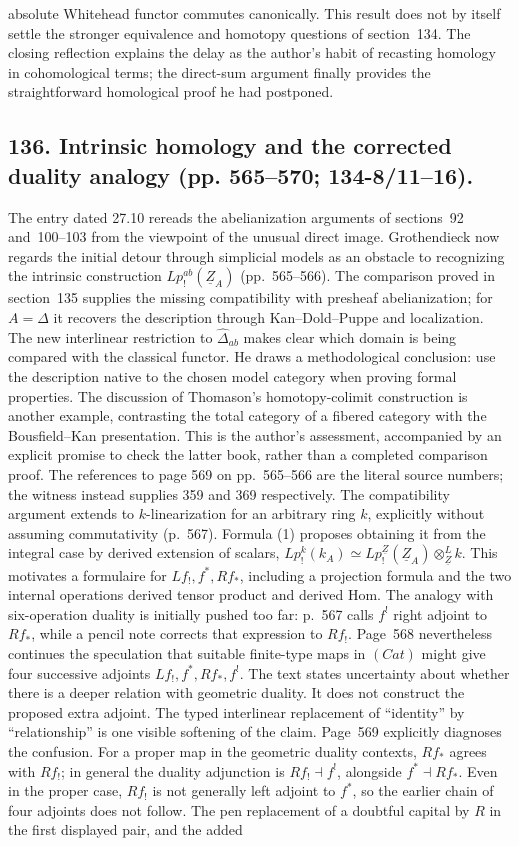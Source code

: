 \documentclass[10pt,oneside]{book}
\begin{document}
absolute Whitehead functor commutes canonically. This result does not by itself settle the stronger equivalence and homotopy questions of section~134. The closing reflection explains the delay as the author's habit of recasting homology in cohomological terms; the direct-sum argument finally provides the straightforward homological proof he had postponed.

\subsection*{136. Intrinsic homology and the corrected duality analogy (pp. 565--570; 134-8/11--16).}
The entry dated 27.10 rereads the abelianization arguments of sections~92 and~100--103 from the viewpoint of the unusual direct image. Grothendieck now regards the initial detour through simplicial models as an obstacle to recognizing the intrinsic construction $Lp^{ab}_{!}(\underline Z_A)$ (pp.~565--566). The comparison proved in section~135 supplies the missing compatibility with presheaf abelianization; for $A=\Delta$ it recovers the description through Kan--Dold--Puppe and localization. The new interlinear restriction to $\widehat\Delta_{ab}$ makes clear which domain is being compared with the classical functor. He draws a methodological conclusion: use the description native to the chosen model category when proving formal properties. The discussion of Thomason's homotopy-colimit construction is another example, contrasting the total category of a fibered category with the Bousfield--Kan presentation. This is the author's assessment, accompanied by an explicit promise to check the latter book, rather than a completed comparison proof. The references to page 569 on pp.~565--566 are the literal source numbers; the witness instead supplies 359 and 369 respectively. The compatibility argument extends to $k$-linearization for an arbitrary ring $k$, explicitly without assuming commutativity (p.~567). Formula (1) proposes obtaining it from the integral case by derived extension of scalars, $Lp^k_{!}(k_A)\simeq Lp^{\underline Z}_{!}(\underline Z_A)\otimes^{L}_{\underline Z}k$. This motivates a formulaire for $Lf_{!},f^*,Rf_*$, including a projection formula and the two internal operations derived tensor product and derived Hom. The analogy with six-operation duality is initially pushed too far: p.~567 calls $f^!$ right adjoint to $Rf_*$, while a pencil note corrects that expression to $Rf_!$. Page~568 nevertheless continues the speculation that suitable finite-type maps in $(Cat)$ might give four successive adjoints $Lf_!,f^*,Rf_*,f^!$. The text states uncertainty about whether there is a deeper relation with geometric duality. It does not construct the proposed extra adjoint. The typed interlinear replacement of ``identity'' by ``relationship'' is one visible softening of the claim. Page~569 explicitly diagnoses the confusion. For a proper map in the geometric duality contexts, $Rf_*$ agrees with $Rf_!$; in general the duality adjunction is $Rf_!\dashv f^!$, alongside $f^*\dashv Rf_*$. Even in the proper case, $Rf_!$ is not generally left adjoint to $f^*$, so the earlier chain of four adjoints does not follow. The pen replacement of a doubtful capital by $R$ in the first displayed pair, and the added 
\end{document}

